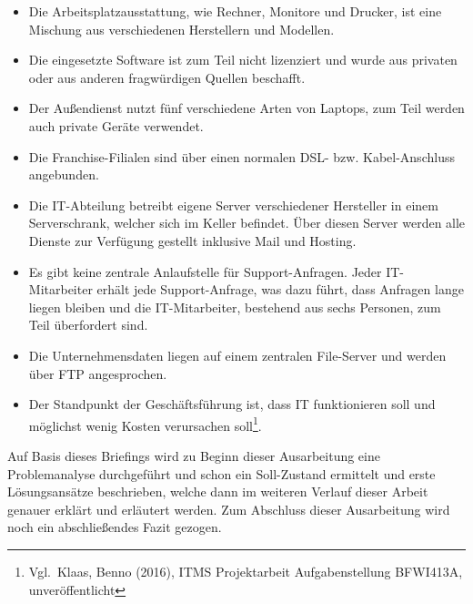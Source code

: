 \begin{itemize}
\item Die Arbeitsplatzausstattung, wie Rechner, Monitore und Drucker,
  ist eine Mischung aus verschiedenen Herstellern und Modellen.
\item Die eingesetzte Software ist zum Teil nicht lizenziert und wurde
  aus privaten oder aus anderen fragwürdigen Quellen beschafft.
\item Der Außendienst nutzt fünf verschiedene Arten von Laptops, zum
  Teil werden auch private Geräte verwendet.
\item Die Franchise-Filialen sind über einen normalen DSL-
  bzw. Kabel-Anschluss angebunden.
\item Die IT-Abteilung betreibt eigene Server verschiedener Hersteller
  in einem Serverschrank, welcher sich im Keller befindet. Über diesen
  Server werden alle Dienste zur Verfügung gestellt inklusive Mail und
  Hosting.
\item Es gibt keine zentrale Anlaufstelle für Support-Anfragen. Jeder
  IT-Mitarbeiter erhält jede Support-Anfrage, was dazu führt, dass
  Anfragen lange liegen bleiben und die IT-Mitarbeiter, bestehend aus
  sechs Personen, zum Teil überfordert sind.
\item Die Unternehmensdaten liegen auf einem zentralen File-Server und
werden über \acrshort{FTP} angesprochen.
\item Der Standpunkt der Geschäftsführung ist, dass IT funktionieren
  soll und möglichst wenig Kosten verursachen
  soll\footnote{Vgl.~Klaas, Benno (2016), ITMS Projektarbeit
    Aufgabenstellung BFWI413A, unveröffentlicht}.
\end{itemize}

Auf Basis dieses Briefings wird zu Beginn dieser Ausarbeitung eine
Problemanalyse durchgeführt und schon ein Soll-Zustand ermittelt und
erste Lösungsansätze beschrieben, welche dann im weiteren Verlauf
dieser Arbeit genauer erklärt und erläutert werden. Zum Abschluss
dieser Ausarbeitung wird noch ein abschließendes Fazit gezogen.
